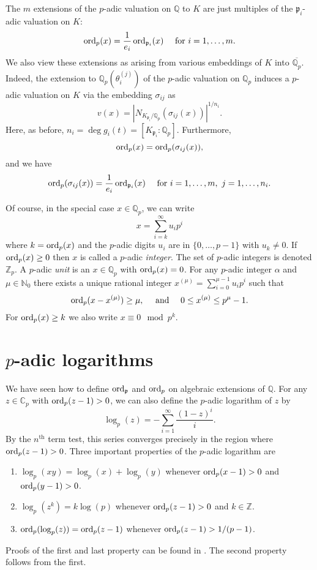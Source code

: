 The $m$ extensions of the $p$-adic valuation on $\mathbb{Q}$ to $K$ are just multiples of the $\mathfrak{p}_i$-adic valuation on $K$:
\[\operatorname{ord}_p(x) = \frac{1}{e_i}\operatorname{ord}_{\mathfrak{p}_i}(x) \quad \text{ for } i = 1, \dots, m.\]
We also view these extensions as arising from various embeddings of $K$ into $\overline{\mathbb{Q}_p}$. Indeed, the extension to $\mathbb{Q}_p(\theta_i^{(j)})$ of the $p$-adic valuation on $\mathbb{Q}_p$ induces a $p$-adic valuation on $K$ via the embedding $\sigma_{ij}$ as 
\[v(x) = |N_{K_{\mathfrak{p}_i}/\mathbb{Q}_p}(\sigma_{ij}(x))|^{1/n_i}.\]
Here, as before, $n_i = \deg g_i(t) = [K_{\mathfrak{p}_i} : \mathbb{Q}_p]$. Furthermore, 
\[\operatorname{ord}_p(x) = \operatorname{ord}_p(\sigma_{ij}(x)),\]
and we have
\[\operatorname{ord}_p(\sigma_{ij}(x)) =  \frac{1}{e_i}\operatorname{ord}_{\mathfrak{p}_i}(x) \quad \text{ for } i = 1, \dots, m,\ j = 1, \dots, n_i.\]

Of course, in the special case $x \in \mathbb{Q}_p$, we can write
\[x = \sum_{i=k}^{\infty} u_ip^i\]
where $k = \operatorname{ord}_p(x)$ and the $p$-adic digits $u_i$ are in $\{0, \dots, p-1\}$ with $u_k \neq 0$. If $\operatorname{ord}_p(x) \geq 0$ then $x$ is called a $p$-adic \textit{integer}. The set of $p$-adic integers is denoted $\mathbb{Z}_p$. A $p$-adic \textit{unit} is an $x \in \mathbb{Q}_p$ with $\operatorname{ord}_p(x) = 0$. For any $p$-adic integer $\alpha$ and $\mu \in \mathbb{N}_0$ there exists a unique rational integer $x^{(\mu)} = \sum_{i=0}^{\mu-1}u_ip^i$ such that 
\[\operatorname{ord}_p(x-x^{(\mu)}) \geq \mu, \quad \text{ and } \quad 0 \leq x^{(\mu)} \leq p^{\mu} - 1.\]
For $\operatorname{ord}_p(x) \geq k$ we also write $x \equiv 0 \mod{p^k}$.


\section{$p$-adic logarithms}
\label{sec:pAdicLogarithms}

We have seen how to define $\operatorname{ord}_{\mathfrak{p}}$ and $\operatorname{ord}_p$ on algebraic extensions of $\mathbb{Q}$. For any $z \in \mathbb{C}_p$ with $\operatorname{ord}_p(z-1) > 0$, we can also define the $p$-adic logarithm of $z$ by
\[\log_p(z) = -\sum_{i=1}^{\infty} \frac{(1-z)^i}{i}.\]
By the $n^{\text{th}}$ term test, this series converges precisely in the region where ${\operatorname{ord}_p(z-1) > 0}$. Three important properties of the $p$-adic logarithm are
\begin{enumerate}
\item $\log_p(xy) = \log_p(x) + \log_p(y)$ whenever $\operatorname{ord}_p(x-1) > 0$ and $\operatorname{ord}_p(y-1) > 0$.
\item $\log_p(z^k) = k \log(p)$ whenever $\operatorname{ord}_p(z-1) > 0$ and $k \in \mathbb{Z}$. 
\item $\operatorname{ord}_p(\log_p(z)) = \operatorname{ord}_p(z-1)$ whenever $\operatorname{ord}_p(z-1) > 1/(p-1)$.
\end{enumerate}
Proofs of the first and last property can be found in . The second property follows from the first.

